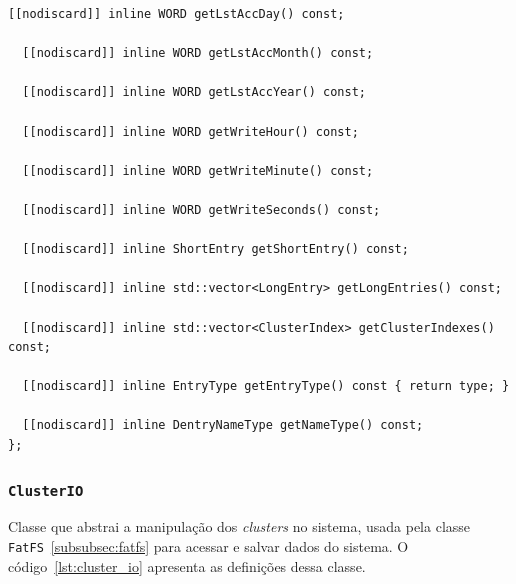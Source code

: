 \documentclass[
    12pt,				%
    oneside,   	        %
    a4paper,			%
    english,			%
    french,				%
    spanish,			%
    brazil,				%
    ]{pacotes/abntex2}
\begin{document}
\begin{lstlisting}[caption={Classe que abstrai entradas longas e curtas em uma única interface}, label={lst:dentry}]
  [[nodiscard]] inline WORD getLstAccDay() const;

  [[nodiscard]] inline WORD getLstAccMonth() const;

  [[nodiscard]] inline WORD getLstAccYear() const;

  [[nodiscard]] inline WORD getWriteHour() const;

  [[nodiscard]] inline WORD getWriteMinute() const;

  [[nodiscard]] inline WORD getWriteSeconds() const;

  [[nodiscard]] inline ShortEntry getShortEntry() const;

  [[nodiscard]] inline std::vector<LongEntry> getLongEntries() const;

  [[nodiscard]] inline std::vector<ClusterIndex> getClusterIndexes() const;

  [[nodiscard]] inline EntryType getEntryType() const { return type; }

  [[nodiscard]] inline DentryNameType getNameType() const;
};
\end{lstlisting}

\subsubsection{\texttt{ClusterIO}}
\label{subsubsec:cluster_io}

Classe que abstrai a manipulação dos \textit{clusters} no sistema, usada pela classe \texttt{FatFS}~\ref{subsubsec:fatfs} para acessar e salvar dados do sistema. O código~\ref{lst:cluster_io} apresenta as definições dessa classe. 
\end{document}
